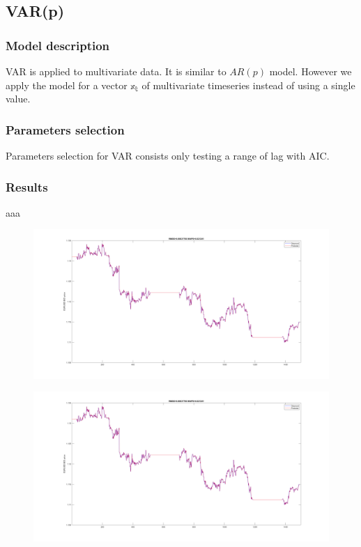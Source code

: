 \documentclass[11pt]{article}
\begin{document}
\subsection{VAR(p)}
\subsubsection{Model description}
VAR is applied to multivariate data. It is similar to $AR(p)$ model. However we
apply the model for a vector ${\mathbb{x_t}}$ of multivariate timeseries instead
of using a single value.

\subsubsection{Parameters selection}
Parameters selection for VAR consists only testing a range of lag with AIC. 

\subsubsection{Results}
aaa
\begin{figure}
  \centering
  \includegraphics[width=0.8\linewidth]{figs/arima_1_1_18_open.png}
  \caption{}
\end{figure}

\begin{figure}
  \centering
  \includegraphics[width=0.8\linewidth]{figs/arima_1_1_18_open.png}
  \caption{}
\end{figure}
\end{document}
